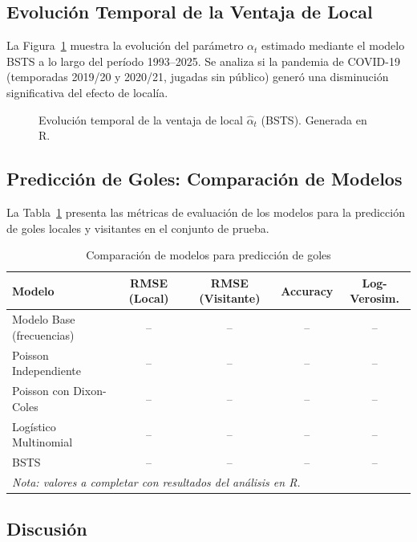 \documentclass[a4paper,12pt]{article}
\begin{document}
\subsection{Evolución Temporal de la Ventaja de Local}

La Figura~\ref{fig:bsts_alpha} muestra la evolución del parámetro $\alpha_t$ estimado mediante el modelo BSTS a lo largo del período 1993--2025. Se analiza si la pandemia de COVID-19 (temporadas 2019/20 y 2020/21, jugadas sin público) generó una disminución significativa del efecto de localía.

\begin{figure}[h!]
    \centering
    \caption{Evolución temporal de la ventaja de local $\hat{\alpha}_t$ (BSTS). Generada en R.}
    \label{fig:bsts_alpha}
\end{figure}

\subsection{Predicción de Goles: Comparación de Modelos}

La Tabla~\ref{tab:comparacion} presenta las métricas de evaluación de los modelos para la predicción de goles locales y visitantes en el conjunto de prueba.

\begin{table}[h!]
\centering
\caption{Comparación de modelos para predicción de goles}
\label{tab:comparacion}
\begin{tabular}{lcccc}
\toprule
Modelo & RMSE (Local) & RMSE (Visitante) & Accuracy & Log-Verosim. \\
\midrule
Modelo Base (frecuencias) & -- & -- & -- & -- \\
Poisson Independiente & -- & -- & -- & -- \\
Poisson con Dixon-Coles & -- & -- & -- & -- \\
Logístico Multinomial & -- & -- & -- & -- \\
BSTS & -- & -- & -- & -- \\
\midrule
\multicolumn{5}{l}{\textit{Nota: valores a completar con resultados del análisis en R.}} \\
\bottomrule
\end{tabular}
\end{table}

\subsection{Discusión}
\end{document}
